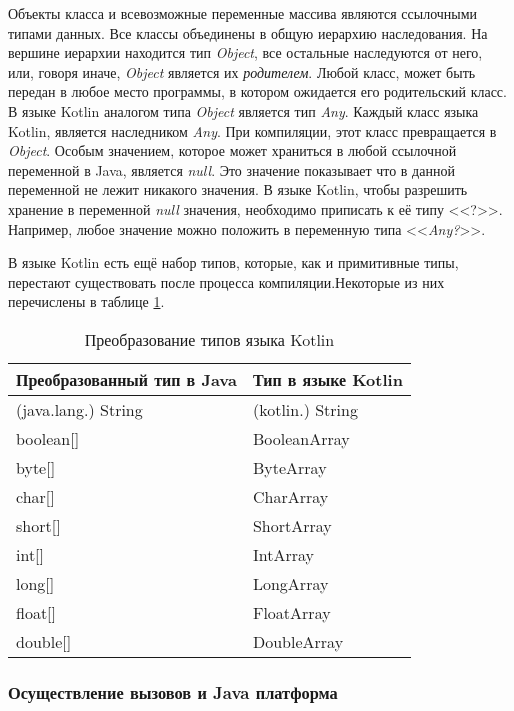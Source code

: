 Объекты класса и всевозможные переменные массива являются ссылочными типами данных. Все классы объединены в общую иерархию наследования. На вершине иерархии находится тип \textit{Object}, все остальные наследуются от него, или, говоря иначе, \textit{Object} является их \textit{родителем}. Любой класс, может быть передан в любое место программы, в котором ожидается его родительский класс. В языке Kotlin аналогом типа \textit{Object} является тип \textit{Any}. Каждый класс языка Kotlin, является наследником \textit{Any}. При компиляции, этот класс превращается в \textit{Object}.
Особым значением, которое может храниться в любой ссылочной переменной в Java, является \textit{null}. Это значение показывает что в данной переменной не лежит никакого значения. В языке Kotlin, чтобы разрешить хранение в переменной \textit{null} значения, необходимо приписать к её типу <<?>>. Например, любое значение можно положить в переменную типа <<\textit{Any?}>>.

В языке Kotlin есть ещё набор типов, которые, как и примитивные типы, перестают существовать после процесса компиляции.Некоторые из них перечислены в таблице \ref{tab:kotlinTypeConversion}.

\begin{table}[h]
\caption{\label{tab:kotlinTypeConversion}Преобразование типов языка Kotlin}
\begin{center}
\begin{tabular}{|l|l|}
\hline
Преобразованный тип в Java & Тип в языке Kotlin \\
\hline
(java.lang.) String & (kotlin.) String \\
boolean[]  & BooleanArray  \\
byte[]  & ByteArray \\
char[]  & CharArray \\
short[]  & ShortArray \\
int[] & IntArray \\
long[] &  LongArray \\
float[] & FloatArray \\
double[] & DoubleArray \\
\hline
\end{tabular}
\end{center}
\end{table}

\subsubsection{Осуществление вызовов и Java платформа}

